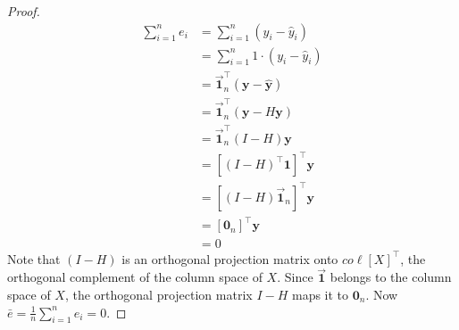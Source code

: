 \documentclass[12pt]{article}
\begin{document}
\begin{enumerate}
\begin{proof}
	\begin{align*}
		\sum_{i=1}^{n}e_i
		&=\sum_{i=1}^{n}(y_i-\hat{y}_i)\\
		&=\sum_{i=1}^{n}1\cdot (y_i-\hat{y}_i)\\
		&=\vec{\mathbf{1}}_n^\top(\mathbf{y}-\hat{\mathbf{y}})\\
		&=\vec{\mathbf{1}}_n^\top (\mathbf{y}-H \mathbf{y})\\
		&=\vec{\mathbf{1}}_n^\top(I-H)\mathbf{y}\\
		&=[(I-H)^\top \mathbf{1}]^\top\mathbf{y}\\
		&=[(I-H)\vec{\mathbf{1}}_n]^\top \mathbf{y}
		\tag{$I$ and $H$ are symmetric}\\
		&=[\mathbf{0}_n]^\top \mathbf{y}\\
		&=0
	\end{align*}
	Note that $(I-H)$ is an orthogonal projection matrix onto $co\ell [X]^\top$,
	the orthogonal complement of the column space of $X$. Since $\vec{\mathbf{1}}$ belongs
	to the column space of $X$, the orthogonal projection matrix $I-H$ maps it to $\mathbf{0}_n$.
	Now $\bar{e}=\frac{1}{n}\sum_{i=1}^{n}e_i=0$.
\end{proof}



\end{enumerate}
\end{document}
